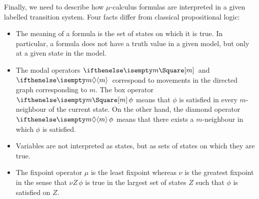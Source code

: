 Finally, we need to describe how $\mu$-calculus
formulas are interpreted in a given labelled transition system.
Four facts differ from classical propositional
logic:
\begin{itemize}
    \item The meaning of a formula is the set of states on which it is true.
        In particular, a formula does not have a truth value in a given model,
        but only at a given state in the model.
    \item The modal operators $\boite m$ and $\diam m$ correspond
        to movements in the directed graph corresponding to $m$.
        The box operator $\boite m \phi$ means that $\phi$ is satisfied in
        every $m$-neighbour of the current state. On the other hand,
        the diamond operator $\diam m \phi$ means that there exists
        a $m$-neighbour in which $\phi$ is satisfied.
    \item Variables are not interpreted as states, but as sets of states
        on which they are true.
    \item The fixpoint operator $\mu$ is the least fixpoint
        whereas $\nu$ is the greatest fixpoint in the sense
        that $\nu Z \, \phi$ is true in the largest set of states $Z$
        such that $\phi$ is satisfied on $Z$.
\end{itemize}

